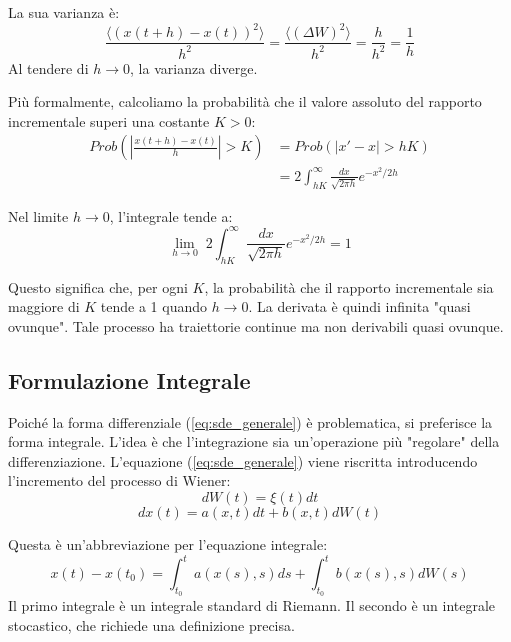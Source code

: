 La sua varianza è:
\begin{equation} 
\frac{\langle (x(t+h)-x(t))^2 \rangle}{h^2} = \frac{\langle (\Delta W)^2 \rangle}{h^2} = \frac{h}{h^2} = \frac{1}{h} 
\end{equation}
Al tendere di $h \to 0$, la varianza diverge.

Più formalmente, calcoliamo la probabilità che il valore assoluto del rapporto incrementale superi una costante $K > 0$:
\begin{equation} 
\begin{aligned}
Prob\left( \left| \frac{x(t+h) - x(t)}{h} \right| > K \right) &= Prob\left( |x'-x| > hK \right) \\ &= 2 \int_{hK}^{\infty} \frac{dx}{\sqrt{2\pi h}} e^{-x^2/2h}
\end{aligned} 
\end{equation}

Nel limite $h \to 0$, l'integrale tende a:
\begin{equation} 
\lim_{h \to 0} \; 2 \int_{hK}^{\infty} \frac{dx}{\sqrt{2\pi h}} e^{-x^2/2h} = 1 
\end{equation}

Questo significa che, per ogni $K$, la probabilità che il rapporto incrementale sia maggiore di $K$ tende a 1 quando $h \to 0$. La derivata è quindi infinita "quasi ovunque". Tale processo ha traiettorie continue ma non derivabili quasi ovunque.

\subsection{Formulazione Integrale}
Poiché la forma differenziale (\ref{eq:sde_generale}) è problematica, si preferisce la forma integrale. L'idea è che l'integrazione sia un'operazione più "regolare" della differenziazione.
L'equazione (\ref{eq:sde_generale}) viene riscritta introducendo l'incremento del processo di Wiener:
\begin{equation}  
dW(t) = \xi(t) dt 
\end{equation}
\begin{equation}
dx(t) = a(x,t) dt + b(x,t) dW(t)
\end{equation}

Questa è un'abbreviazione per l'equazione integrale:
\begin{equation}
x(t) - x(t_0) = \int_{t_0}^t a(x(s), s) ds + \int_{t_0}^t b(x(s), s) dW(s)
\end{equation}
Il primo integrale è un integrale standard di Riemann. Il secondo è un integrale stocastico, che richiede una definizione precisa.